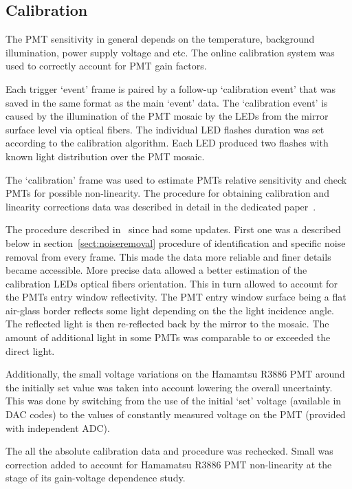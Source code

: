 \documentclass[final,5p,times,twocolumn]{elsarticle}
\begin{document}
\subsection{Calibration}
The PMT sensitivity in general depends on the temperature, background illumination, power supply voltage and etc. The online calibration system was used to correctly account for PMT gain factors.

Each trigger `event' frame is paired by a follow-up `calibration event' that was saved in the same format as the main `event' data. The `calibration event' is caused by the illumination of the PMT mosaic by the LEDs from the mirror surface level via optical fibers. The individual LED flashes duration was set according to the calibration algorithm. Each LED produced two flashes with known light distribution over the PMT mosaic. 

The `calibration' frame was used to estimate PMTs relative sensitivity and check PMTs for possible non-linearity. The procedure for obtaining calibration and linearity corrections data was described in detail in the dedicated paper~\cite{Ant16}. 

The procedure described in~\cite{Ant16} since had some updates. First one was a described below in section~\ref{sect:noiseremoval} procedure of identification and specific noise removal from every frame. This made the data more reliable and finer details became accessible. More precise data allowed a better estimation of the calibration LEDs optical fibers orientation. This in turn allowed to account for the PMTs entry window reflectivity. The PMT entry window surface being a flat air-glass border reflects some light depending on the the light incidence angle. The reflected light is then re-reflected back by the mirror to the mosaic. The amount of additional light in some PMTs was comparable to or exceeded the direct light.

Additionally, the small voltage variations on the Hamamtsu R3886 PMT around the initially set value was taken into account lowering the overall uncertainty. This was done by switching from the use of the initial `set' voltage (available in DAC codes) to the values of constantly measured voltage on the PMT (provided with independent ADC).

The all the absolute calibration data and procedure was rechecked. Small was correction added to account for Hamamatsu R3886 PMT non-linearity at the stage of its gain-voltage dependence study.
\end{document}
